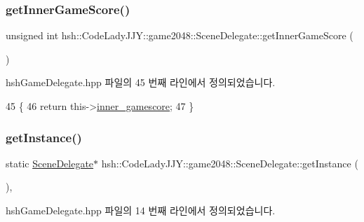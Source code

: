 \subsubsection{\texorpdfstring{get\+Inner\+Game\+Score()}{getInnerGameScore()}}
{\footnotesize\ttfamily unsigned int hsh\+::\+Code\+Lady\+J\+J\+Y\+::game2048\+::\+Scene\+Delegate\+::get\+Inner\+Game\+Score (\begin{DoxyParamCaption}{ }\end{DoxyParamCaption})\hspace{0.3cm}{\ttfamily [inline]}}



hsh\+Game\+Delegate.\+hpp 파일의 45 번째 라인에서 정의되었습니다.


\begin{DoxyCode}
45                                                 \{
46                     \textcolor{keywordflow}{return} this->\hyperlink{classhsh_1_1_code_lady_j_j_y_1_1game2048_1_1_scene_delegate_af8e4687385133b732cc12f92d4118862}{inner\_gamescore};
47                 \}
\end{DoxyCode}
\mbox{\label{classhsh_1_1_code_lady_j_j_y_1_1game2048_1_1_scene_delegate_a332a574da455fb687b5d283399a6976c}} 
\subsubsection{\texorpdfstring{get\+Instance()}{getInstance()}}
{\footnotesize\ttfamily static \hyperlink{classhsh_1_1_code_lady_j_j_y_1_1game2048_1_1_scene_delegate}{Scene\+Delegate}$\ast$ hsh\+::\+Code\+Lady\+J\+J\+Y\+::game2048\+::\+Scene\+Delegate\+::get\+Instance (\begin{DoxyParamCaption}{ }\end{DoxyParamCaption})\hspace{0.3cm}{\ttfamily [inline]}, {\ttfamily [static]}}



hsh\+Game\+Delegate.\+hpp 파일의 14 번째 라인에서 정의되었습니다.


